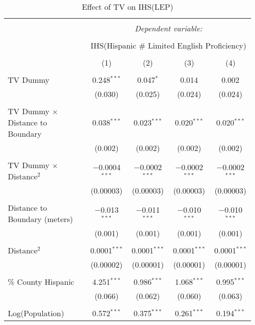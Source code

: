 
\begin{table}[!htbp] \centering 
  \caption{Effect of TV on IHS(LEP)} 
  \label{} 
\begin{tabular}{@{\extracolsep{-2pt}}lcccc} 
\\[-1.8ex]\hline 
\hline \\[-1.8ex] 
 & \multicolumn{4}{c}{\textit{Dependent variable:}} \\ 
\cline{2-5} 
\\[-1.8ex] & \multicolumn{4}{c}{IHS(Hispanic \# Limited English Proficiency)} \\ 
\\[-1.8ex] & (1) & (2) & (3) & (4)\\ 
\hline \\[-1.8ex] 
 TV Dummy & 0.248$^{***}$ & 0.047$^{*}$ & 0.014 & 0.002 \\ 
  & (0.030) & (0.025) & (0.024) & (0.024) \\ 
  & & & & \\ 
 TV Dummy $\times$ Distance to Boundary & 0.038$^{***}$ & 0.023$^{***}$ & 0.020$^{***}$ & 0.020$^{***}$ \\ 
  & (0.002) & (0.002) & (0.002) & (0.002) \\ 
  & & & & \\ 
 TV Dummy $\times$ Distance$^{2}$ & $-$0.0004$^{***}$ & $-$0.0002$^{***}$ & $-$0.0002$^{***}$ & $-$0.0002$^{***}$ \\ 
  & (0.00003) & (0.00003) & (0.00003) & (0.00003) \\ 
  & & & & \\ 
 Distance to Boundary (meters) & $-$0.013$^{***}$ & $-$0.011$^{***}$ & $-$0.010$^{***}$ & $-$0.010$^{***}$ \\ 
  & (0.001) & (0.001) & (0.001) & (0.001) \\ 
  & & & & \\ 
 Distance$^{2}$ & 0.0001$^{***}$ & 0.0001$^{***}$ & 0.0001$^{***}$ & 0.0001$^{***}$ \\ 
  & (0.00002) & (0.00001) & (0.00001) & (0.00001) \\ 
  & & & & \\ 
 \% County Hispanic & 4.251$^{***}$ & 0.986$^{***}$ & 1.068$^{***}$ & 0.995$^{***}$ \\ 
  & (0.066) & (0.062) & (0.060) & (0.063) \\ 
  & & & & \\ 
 Log(Population) & 0.572$^{***}$ & 0.375$^{***}$ & 0.261$^{***}$ & 0.194$^{***}$ \\ 

\end{tabular}
\end{table}
